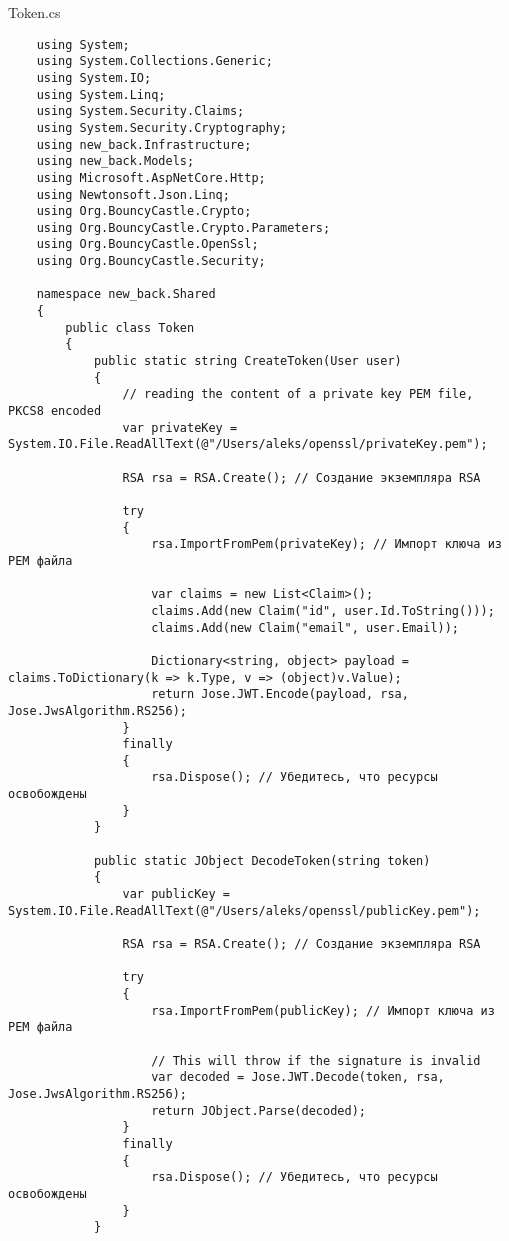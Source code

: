 Token.cs
\lstset{style=sharpc}
\begin{lstlisting}
    using System;
    using System.Collections.Generic;
    using System.IO;
    using System.Linq;
    using System.Security.Claims;
    using System.Security.Cryptography;
    using new_back.Infrastructure;
    using new_back.Models;
    using Microsoft.AspNetCore.Http;
    using Newtonsoft.Json.Linq;
    using Org.BouncyCastle.Crypto;
    using Org.BouncyCastle.Crypto.Parameters;
    using Org.BouncyCastle.OpenSsl;
    using Org.BouncyCastle.Security;
    
    namespace new_back.Shared
    {
        public class Token
        {
            public static string CreateToken(User user)
            {
                // reading the content of a private key PEM file, PKCS8 encoded 
                var privateKey = System.IO.File.ReadAllText(@"/Users/aleks/openssl/privateKey.pem");
                
                RSA rsa = RSA.Create(); // Создание экземпляра RSA
    
                try
                {
                    rsa.ImportFromPem(privateKey); // Импорт ключа из PEM файла
    
                    var claims = new List<Claim>();
                    claims.Add(new Claim("id", user.Id.ToString()));
                    claims.Add(new Claim("email", user.Email));
    
                    Dictionary<string, object> payload = claims.ToDictionary(k => k.Type, v => (object)v.Value);
                    return Jose.JWT.Encode(payload, rsa, Jose.JwsAlgorithm.RS256);
                }
                finally
                {
                    rsa.Dispose(); // Убедитесь, что ресурсы освобождены
                }
            }
            
            public static JObject DecodeToken(string token)
            {
                var publicKey = System.IO.File.ReadAllText(@"/Users/aleks/openssl/publicKey.pem");
                
                RSA rsa = RSA.Create(); // Создание экземпляра RSA
    
                try
                {
                    rsa.ImportFromPem(publicKey); // Импорт ключа из PEM файла
    
                    // This will throw if the signature is invalid
                    var decoded = Jose.JWT.Decode(token, rsa, Jose.JwsAlgorithm.RS256);
                    return JObject.Parse(decoded);  
                }
                finally
                {
                    rsa.Dispose(); // Убедитесь, что ресурсы освобождены
                }
            }
    

\end{lstlisting}
